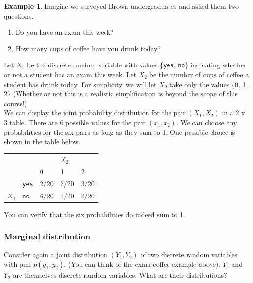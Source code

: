 \documentclass[12pt]{article}
\theoremstyle{definition}
\newtheorem*{example}{Example}
\theoremstyle{remark}
\begin{document}
\begin{example}Imagine we surveyed Brown undergraduates and asked them two questions. 
\begin{enumerate}
\item Do you have an exam this week? 
\item How many cups of coffee have you drunk today?
\end{enumerate}
Let $X_1$ be the discrete random variable with values \{\texttt{yes}, \texttt{no}\} indicating whether or not a student has an exam this week. Let $X_2$ be the number of cups of coffee a student has drunk today. For simplicity, we will let $X_2$ take only the values \{0, 1, 2\} (Whether or not this is a realistic simplification is beyond the scope of this course!)\\

We can display the joint probability distribution for the pair $(X_1, X_2)$ in a 2 x 3 table. There are 6 possible values for the pair $(x_1, x_2)$. We can choose any probabilities for the six pairs as long as they sum to 1. One possible choice is shown in the table below.

\begin{table}[H]
\centering
\begin{tabular}{lllll}
                       &                                 &      & $X_2$    &                           \\ \cline{3-5}
                       &                                 & 0    & 1    & 2                         \\ \cline{3-5}
\multicolumn{1}{l|}{}  & \multicolumn{1}{l|}{\texttt{yes}}    & 2/20 & 3/20 & \multicolumn{1}{l|}{3/20} \\
\multicolumn{1}{l|}{$X_1$} & \multicolumn{1}{l|}{\texttt{no}} & 6/20 & 4/20 & \multicolumn{1}{l|}{2/20} \\ \cline{3-5}                  
\end{tabular}
\end{table}
You can verify that the six probabilities do indeed sum to 1.
\end{example}

\subsubsection{Marginal distribution}
Consider again a joint distribution $(Y_1, Y_2)$ of two discrete random variables with pmf $p(y_1, y_2)$. (You can think of the exam-coffee example above). $Y_1$ and $Y_2$ are themselves discrete random variables. What are their distributions? \\
\end{document}
